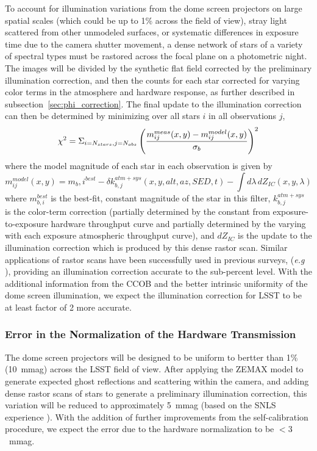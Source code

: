 \documentclass[12pt,preprint]{aastex}
\begin{document}
To account for illumination variations from the dome screen projectors
on large spatial scales (which could be up to 1\% across the field of
view), stray light scattered from other unmodeled surfaces, or systematic
differences in exposure time due to the camera shutter movement,  a dense
network of stars of a variety of spectral types must be rastored
across the focal plane on a photometric night. The images will be
divided by the synthetic flat field corrected by the preliminary
illumination correction, and then the counts for each star corrected
for varying color terms in the atmosphere and hardware response, as
further described in subsection~\ref{sec:phi_correction}.  The final
update to the illumination correction can then be determined by
minimizing over all stars $i$ in all observations $j$,
\begin{equation}
 \chi^2 =  \Sigma_{i=N_{stars},j=N_{obs}} \left( { m_{ij}^{meas}(x,y) - m_{ij}^{model}(x,y)
\over \sigma_b} \right)^2  
\end{equation}
where the model magnitude of each star in each observation is given by
\begin{equation}
m_{ij}^{model}(x,y) =  m_b,i^{best} - \delta k_{b,j}^{atm+sys}(x,y,alt,az,SED,t) - \int d\lambda \, dZ_{IC}(x,y,\lambda)
\end{equation}
where $m_{b,i}^{best}$ is the best-fit, constant magnitude of the star
in this filter, $k_{b,j}^{atm+sys}$ is the color-term correction
(partially determined by the constant from exposure-to-exposure
hardware throughput curve and partially determined by the varying with
each exposure atmospheric throughput curve), and $dZ_{IC}$ is the
update to the illumination correction which is produced by this dense
rastor scan. Similar applications of rastor scans have been
successfully used in previous surveys, ({\it e.g} \citet{Regnault2009,
Magnier2004, Manfroid1996}), providing an illumination correction
accurate to the sub-percent level. With the additional information
from the CCOB and the better intrinsic uniformity of the dome screen
illumination, we expect the illumination correction for LSST to be at
least factor of 2 more accurate.

\subsubsection{Error in the Normalization of the Hardware Transmission}

The dome screen projectors will be designed to be uniform to bertter
than 1\% (10~mmag) across the LSST field of view. After
applying the ZEMAX model to generate expected ghost reflections and
scattering within the camera, and adding dense rastor scans of stars to 
generate a preliminary illumination correction, this variation will be 
reduced to approximately 5~mmag (based on the SNLS experience \citep{Regnault2009}).
With the addition of further improvements from the self-calibration procedure,
we expect the error due to the hardware normalization to be $<3$~mmag. 
\end{document}

